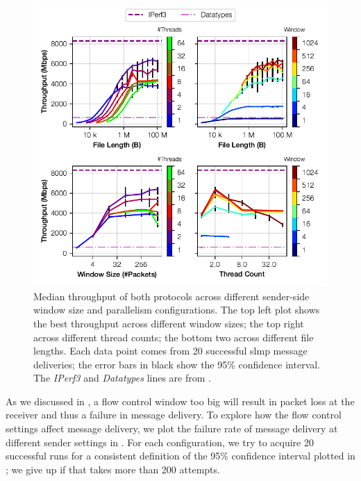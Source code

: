 \begin{figure}[t]
    \centering
    \includegraphics{thesis/figures/slmp-tput.pdf}
    \caption{Median throughput of both protocols across different sender-side window size and parallelism configurations.  The top left plot shows the best throughput across different window sizes; the top right across different thread counts; the bottom two across different file lengths.  Each data point comes from 20 successful \ac{slmp} message deliveries; the error bars in black show the 95\% confidence interval.  The \emph{IPerf3} and \emph{Datatypes} lines are from .} \label{fig:slmp-tput}
\end{figure}

As we discussed in , a flow control window too big will result in packet loss at the receiver and thus a failure in message delivery.  To explore how the flow control settings affect message delivery, we plot the failure rate of message delivery at different sender settings in .  For each configuration, we try to acquire 20 successful runs for a consistent definition of the 95\% confidence interval plotted in ; we give up if that takes more than 200 attempts.

